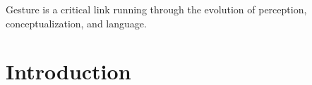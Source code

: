 \begin{savequote}
Gesture is a critical link running through the evolution of perception,
conceptualization, and language.
\end{savequote}
\chapter{Introduction}
% 
% 
